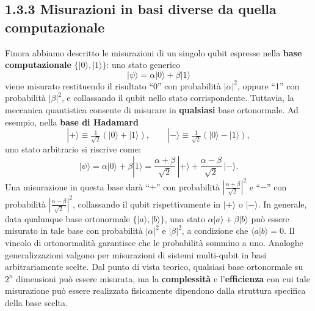 \documentclass[a4paper,12pt]{report}
\theoremstyle{plain}
\begin{document}
\subsection*{1.3.3 Misurazioni in basi diverse da quella computazionale}
Finora abbiamo descritto le misurazioni di un singolo qubit espresse nella \textbf{base computazionale} $\{|0\rangle,|1\rangle\}$: uno stato generico
\[
|\psi\rangle = \alpha|0\rangle + \beta|1\rangle
\]
viene misurato restituendo il risultato ``0'' con probabilità $|\alpha|^2$, oppure ``1'' con probabilità $|\beta|^2$, e collassando il qubit nello stato corrispondente.
Tuttavia, la meccanica quantistica consente di misurare in \textbf{qualsiasi} base ortonormale. Ad esempio, nella \textbf{base di Hadamard}
\[
|+\rangle \equiv \tfrac{1}{\sqrt{2}}(|0\rangle+|1\rangle), \qquad
|-\rangle \equiv \tfrac{1}{\sqrt{2}}(|0\rangle-|1\rangle),
\]
uno stato arbitrario si riscrive come:
\begin{equation}
|\psi\rangle
= \alpha|0\rangle+\beta|1\rangle
= \frac{\alpha+\beta}{\sqrt{2}}\,|+\rangle
+ \frac{\alpha-\beta}{\sqrt{2}}\,|-\rangle.
\end{equation}
Una misurazione in questa base darà ``$+$'' con probabilità $\left|\tfrac{\alpha+\beta}{\sqrt{2}}\right|^2$ e ``$-$'' con probabilità $\left|\tfrac{\alpha-\beta}{\sqrt{2}}\right|^2$, collassando il qubit rispettivamente in $|+\rangle$ o $|-\rangle$.
In generale, data qualunque base ortonormale $\{|a\rangle,|b\rangle\}$, uno stato
$\alpha|a\rangle+\beta|b\rangle$ può essere misurato in tale base con probabilità $|\alpha|^2$ e $|\beta|^2$, a condizione che $\langle a|b\rangle=0$. Il vincolo di ortonormalità garantisce che le probabilità sommino a uno.
Analoghe generalizzazioni valgono per misurazioni di sistemi multi-qubit in basi arbitrariamente scelte. Dal punto di vista teorico, qualsiasi base ortonormale su $2^n$ dimensioni può essere misurata, ma la \textbf{complessità} e l'\textbf{efficienza} con cui tale misurazione può essere realizzata fisicamente dipendono dalla struttura specifica della base scelta.
\end{document}
